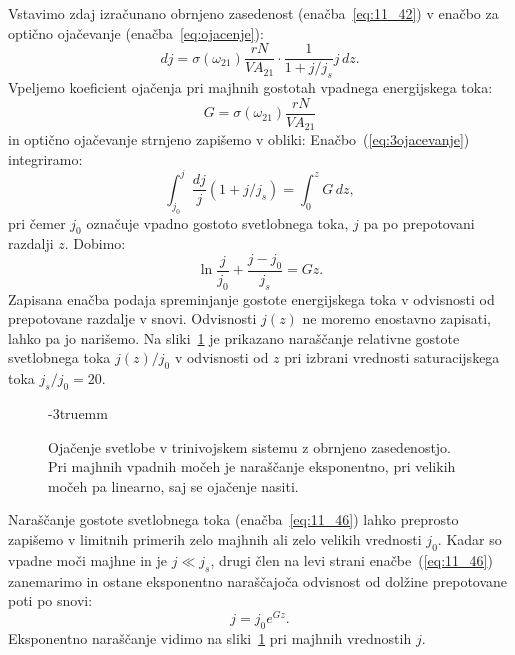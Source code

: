 Vstavimo zdaj izračunano obrnjeno zasedenost (enačba~\ref{eq:11_42}) v enačbo za 
optično ojačevanje (enačba~\ref{eq:ojacenje}):
\begin{equation}
dj = \sigma (\omega_{21})\frac{rN}{VA_{21}}\cdot \frac{1}{1 + j/j_s}j\,dz.
\label{eq:11_43}
\end{equation}
Vpeljemo koeficient ojačenja pri majhnih gostotah vpadnega
energijskega toka:
\begin{equation}
G = \sigma(\omega_{21})\frac{rN}{VA_{21}}
\label{eq:11_44}
\end{equation}
in optično ojačevanje strnjeno zapišemo v obliki:
Enačbo~(\ref{eq:3ojacevanje}) integriramo:
\begin{equation}
\int_{j_0}^j \frac{dj}{j}\left(1 + j/j_s\right) = \int_0^z G\, dz,
\label{eq:11_45}
\end{equation}
pri čemer $j_0$ označuje vpadno gostoto svetlobnega toka, $j$ pa po 
prepotovani razdalji $z$. Dobimo:
\begin{equation}
\ln\frac{j}{j_0} + \frac{j-j_0}{j_s} = Gz.
\label{eq:11_46}
\end{equation}
Zapisana enačba podaja spreminjanje gostote
energijskega toka v odvisnosti od prepotovane razdalje v snovi. Odvisnosti
$j(z)$ ne moremo enostavno zapisati, lahko pa jo narišemo.
Na sliki~\ref{fig:11_ojacenje} je prikazano naraščanje
relativne gostote svetlobnega toka $j(z)/j_0$ v odvisnosti od $z$ pri 
izbrani vrednosti saturacijskega toka $j_s/j_0 = 20$.
\begin{figure}[ht!]
\centering
\def\svgwidth{65truemm} 

\caption{Ojačenje svetlobe v trinivojskem sistemu z obrnjeno zasedenostjo.
Pri majhnih vpadnih močeh je naraščanje eksponentno, pri velikih močeh 
pa linearno, saj se ojačenje nasiti.
}
\label{fig:11_ojacenje}
\vglue-3truemm
\end{figure}

Naraščanje gostote svetlobnega toka (enačba~\ref{eq:11_46}) 
lahko preprosto zapišemo v limitnih primerih zelo majhnih ali 
zelo velikih vrednosti $j_0$. 
Kadar so vpadne moči majhne in je $j \ll j_s$, drugi člen
na levi strani enačbe~(\ref{eq:11_46}) zanemarimo in ostane eksponentno 
naraščajoča odvisnost od dolžine prepotovane poti po snovi:
\begin{equation}
j = j_0e^{Gz}.
\label{eq:11_47}
\end{equation}
Eksponentno naraščanje vidimo na sliki~\ref{fig:11_ojacenje}
pri majhnih vrednostih $j$. 

